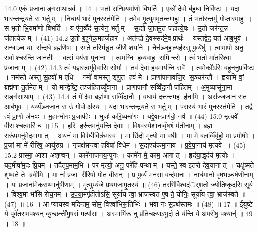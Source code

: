 14.0
एकं॑ प्र॒जानाङ्गसाथा॒न्नव॑ ॥ 14 ।
भ॒र्ता सन्भ्रि॒यमा॑णो बिभर्ति । एको॑ दे॒वो ब॑हु॒धा निवि॑ष्टः । य॒दा भा॒रन्त॒न्द्रय॑ते॒ स भर्तुम् । नि॒धाय॑ भा॒रं पुन॒रस्त॑मेति । तमे॒व मृ॒त्युम॒मृत॒न्तमा॑हुः । तं भ॒र्तार॒न्तमु॑ गो॒प्तार॑माहुः । स भृ॒तो भ्रि॒यमा॑णो बिभर्ति । य ए॑न॒व्वेँद॑ स॒त्येन॒ भर्तुम् । स॒द्यो जा॒तमु॒त ज॑हात्ये॒षः । उ॒तो जर॑न्त॒न्न ज॑हा॒त्येकम् । (41)
14.2
उ॒तो ब॒हूनेक॒मह॑र्जहार । अत॑न्द्रो दे॒वस्सद॑मे॒व प्रार्थः॑ । यस्तद्वेद॒ यत॑ आब॒भूव॑ । स॒न्धाञ्च॒ या स॑न्द॒धे ब्रह्म॑णै॒षः । रम॑ते॒ तस्मि॑न्नु॒त जी॒र्णे शया॑ने । नैन॑ञ्जहा॒त्यह॑स्सु पू॒र्व्येषु॑ । त्वामापो॒ अनु॒ सर्वाश्चरन्ति जान॒तीः । व॒त्सं पय॑सा पुना॒नाः । त्वम॒ग्नि ह॑व्य॒वाह॒ समिन्त्से । त्वं भ॒र्ता मा॑त॒रिश्वा प्र॒जानाम् । (42)
14.3
त्वं य॒ज्ञस्त्वमु॑वे॒वासि॒ सोमः॑ । तव॑ दे॒वा हव॒माय॑न्ति॒ सर्वे । त्वमेको॑ऽसि ब॒हूननु॒प्रवि॑ष्टः । नम॑स्ते अस्तु सु॒हवो॑ म एधि । नमो॑ वामस्तु शृणु॒त हवं॑ मे । प्राणा॑पानावजि॒र स॒ञ्चर॑न्तौ । ह्वया॑मि वां॒ ब्रह्म॑णा तू॒र्तमेतम् । यो मान्द्वेष्टि॒ तञ्ज॑हितय्युँवाना । प्राणा॑पानौ सव्विँदा॒नौ ज॑हितम् । अ॒मुष्यासु॑ना॒मा सङ्ग॑साथाम् । (43)
14.4
तं मे॑ देवा॒ ब्रह्म॑णा सव्विँदा॒नौ । व॒धाय॑ दत्त॒न्तम॒ह ह॑नामि । अस॑ज्जजान स॒त आब॑भूव । यय्यँ॑ञ्ज॒जान॒ स उ॑ गो॒पो अ॑स्य । य॒दा भा॒रन्त॒न्द्रय॑ते॒ स भर्तुम् । प॒रास्य॑ भा॒रं पुन॒रस्त॑मेति । तद्वै त्वं प्रा॒णो अ॑भवः । म॒हान्भोगः॑ प्र॒जाप॑तेः । भुजः॑ करि॒ष्यमा॑णः । यद्दे॒वान्प्राण॑यो॒ नव॑ ॥ (44)
15.0
मृ॒त्यवे॑ वी॒राश्च॒त्वारि॑ च ॥ 15 ।
हरि॒ हर॑न्त॒मनु॑यन्ति दे॒वाः । विश्व॒स्येशा॑नव्वृँष॒भं म॑ती॒नाम् । ब्रह्म॒ सरू॑प॒मनु॑मे॒दमागात् । अय॑नं॒ मा विव॑धी॒र्विक्र॑मस्व । मा छि॑दो मृत्यो॒ मा व॑धीः । मा मे॒ बल॒व्विँवृ॑हो॒ मा प्रमो॑षीः । प्र॒जां मा मे॑ रीरिष॒ आयु॑रुग्र । नृ॒चक्ष॑सन्त्वा ह॒विषा॑ विधेम । स॒द्यश्च॑कमा॒नाय॑ । प्र॒वे॒पा॒नाय॑ मृ॒त्यवे । (45)
15.2
प्रास्मा॒ आशा॑ अशृण्वन् । कामे॑नाजनय॒न्पुनः॑ । कामे॑न मे॒ काम॒ आगात् । हृद॑या॒द्धृद॑यं मृ॒त्योः । यद॒मीषा॑म॒दः प्रि॒यम् । तदैतूप॒माम॒भि । परं॑ मृत्यो॒ अनु॒ परे॑हि॒ पन्थाम् । यस्ते॒ स्व इत॑रो देव॒यानात् । चक्षु॑ष्मते शृण्व॒ते ते ब्रवीमि । मा नः॑ प्र॒जा री॑रिषो॒ मोत वी॒रान् । प्र पू॒र्व्यं मन॑सा॒ वन्द॑मानः । नाध॑मानो वृष॒भञ्च॑र्\mbox{}षणी॒नाम् । यः प्र॒जाना॑मेक॒राण्मानु॑षीणाम् । मृ॒त्युय्यँ॑जे प्रथम॒जामृ॒तस्य॑ ॥ (46)
त॒रणि॑र्वि॒श्वद॑र््शतो ज्योति॒ष्कृद॑सि सूर्य । विश्व॒मा भा॑सि रोच॒नम् । उ॒प॒या॒मगृ॑हीतोऽसि॒ सूर्या॑य त्वा॒ भ्राज॑स्वत ए॒ष ते॒ योनिः॒ सूर्या॑य त्वा॒ भ्राज॑स्वते ॥ (47) ॥ 16 ॥
आ प्या॑यस्व मदिन्तम॒ सोम॒ विश्वा॑भिरू॒तिभिः॑ । भवा॑ नः स॒प्रथ॑स्तमः ॥ (48) ॥ 17 ॥
ई॒युष्टे ये पूर्व॑तरा॒मप॑श्यन् व्यु॒च्छन्ती॑मु॒षसं॒ मर्त्या॑सः । अ॒स्माभि॑रू॒ नु प्र॑ति॒चक्ष्या॑ऽभू॒दो ते य॑न्ति॒ ये अ॑प॒रीषु॒ पश्यान्॑ ॥ 49 । 18 ॥
